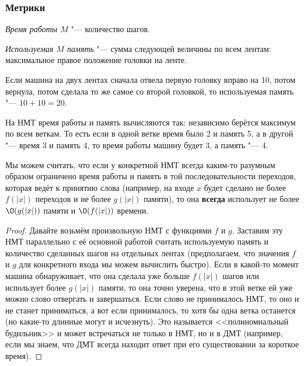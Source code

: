 \subsubsection{Метрики}
	\begin{Def}
		\textit{Время работы $M$} "--- количество шагов.
	\end{Def}
	\begin{Def}
		\textit{Используемая $M$ память} "--- сумма следующей величины по всем лентам: максимальное правое положение головки на ленте.
	\end{Def}
	\begin{exmp}
		Если машина на двух лентах сначала отвела первую головку вправо на 10, потом вернула, потом сделала то же самое со второй головкой,
		то используемая память "--- $10+10=20$.
	\end{exmp}

	\begin{Def}
		На НМТ время работы и память вычисляются так: независимо берётся максимум по всем веткам.
		То есть если в одной ветке время было 2 и память 5, а в другой "--- время 3 и память 4, то время работы машину будет 3, а память "--- 4.
	\end{Def}
	\begin{assertion}
		Мы можем считать, что если у конкретной НМТ всегда каким-то разумным образом ограничено время работы и память в той последовательности переходов,
		которая ведёт к принятию слова (например, на входе $x$ будет сделано не более $f(|x|)$ переходов и не более $g(|x|)$ памяти),
		то она \textbf{всегда} использует не более $\O(g(|x|))$ памяти и $\O(f(|x|))$ времени.
	\end{assertion}
	\begin{proof}
		Давайте возьмём произвольную НМТ с функциями $f$ и $g$.
		Заставим эту НМТ параллельно с её основной работой считать используемую память и количество сделанных шагов на отдельных лентах
		(предполагаем, что значения $f$ и $g$ для конкретного входа мы можем вычислить быстро).
		Если в какой-то момент машина обнаруживает, что она сделала уже больше $f(|x|)$ шагов или использует более $g(|x|)$ памяти,
		то она точно уверена, что в этой ветке ей уже можно слово отвергать и завершаться.
		Если слово не принималось НМТ, то оно и не станет приниматься, а вот если принималось, то хотя бы одна ветка останется (но какие-то длинные могут и исчезнуть).
		Это называется <<полиномиальный будильник>> и может встречаться не только в НМТ, но и в ДМТ (например, если мы знаем, что ДМТ всегда находит ответ при его существовании
		за короткое время).
	\end{proof}


